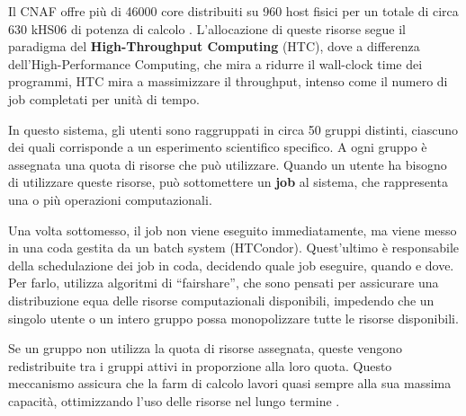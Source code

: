 Il CNAF offre più di 46000 core distribuiti su 960 host fisici per un totale
di circa $630$ kHS06 di potenza di calcolo \cite{hepix2022}. L'allocazione di
queste risorse segue il paradigma del \textbf{High-Throughput Computing}
(HTC), dove a differenza dell'High-Performance Computing, che mira a ridurre
il wall-clock time dei programmi, HTC mira a massimizzare il throughput,
intenso come il numero di job completati per unità di tempo.

In questo sistema, gli utenti sono raggruppati in circa 50 gruppi distinti,
ciascuno dei quali corrisponde a un esperimento scientifico specifico. A ogni
gruppo è assegnata una quota di risorse che può utilizzare. Quando un utente
ha bisogno di utilizzare queste risorse, può sottomettere un \textbf{job} al
sistema, che rappresenta una o più operazioni computazionali.

Una volta sottomesso, il job non viene eseguito immediatamente, ma viene messo
in una coda gestita da un batch system (HTCondor). Quest'ultimo è responsabile
della schedulazione dei job in coda, decidendo quale job eseguire, quando e
dove. Per farlo, utilizza algoritmi di ``fairshare'', che sono pensati per
assicurare una distribuzione equa delle risorse computazionali disponibili,
impedendo che un singolo utente o un intero gruppo possa monopolizzare tutte
le risorse disponibili.


Se un gruppo non utilizza la quota di risorse assegnata, queste vengono
redistribuite tra i gruppi attivi in proporzione alla loro quota. Questo
meccanismo assicura che la farm di calcolo lavori quasi sempre alla sua
massima capacità, ottimizzando l'uso delle risorse nel lungo termine
\cite{cnaf_calcolo}.

